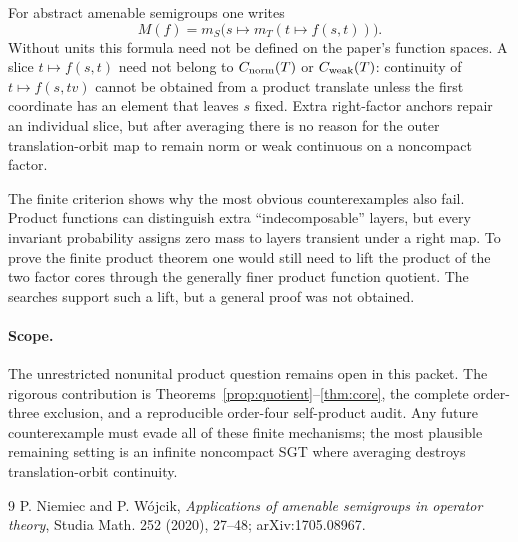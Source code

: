 \documentclass[11pt]{article}
\begin{document}
For abstract amenable semigroups one writes
\[
 M(f)=m_S\bigl(s\mapsto m_T(t\mapsto f(s,t))\bigr).
\]
Without units this formula need not be defined on the paper's function spaces.
A slice $t\mapsto f(s,t)$ need not belong to $C_{\rm norm}(T)$ or
$C_{\rm weak}(T)$: continuity of $t\mapsto f(s,tv)$ cannot be obtained from a
product translate unless the first coordinate has an element that leaves $s$
fixed.  Extra right-factor anchors repair an individual slice, but after
averaging there is no reason for the outer translation-orbit map to remain norm
or weak continuous on a noncompact factor.

The finite criterion shows why the most obvious counterexamples also fail.
Product functions can distinguish extra ``indecomposable'' layers, but every
invariant probability assigns zero mass to layers transient under a right map.
To prove the finite product theorem one would still need to lift the product of
the two factor cores through the generally finer product function quotient.
The searches support such a lift, but a general proof was not obtained.

\paragraph{Scope.}
The unrestricted nonunital product question remains open in this packet.  The
rigorous contribution is Theorems~\ref{prop:quotient}--\ref{thm:core}, the
complete order-three exclusion, and a reproducible order-four self-product
audit.  Any future counterexample must evade all of these finite mechanisms;
the most plausible remaining setting is an infinite noncompact SGT where
averaging destroys translation-orbit continuity.

\begin{thebibliography}{9}
P. Niemiec and P. W\'ojcik,
\emph{Applications of amenable semigroups in operator theory},
Studia Math. 252 (2020), 27--48; arXiv:1705.08967.
\end{thebibliography}
\end{document}
